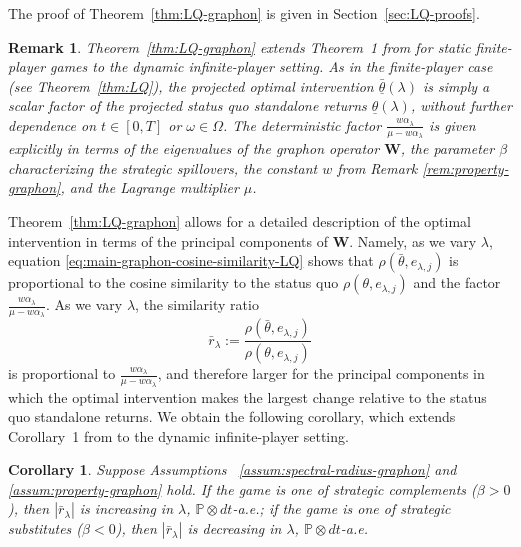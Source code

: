 \documentclass[11pt]{article}
\def\al{\alpha}
\def\P{\mathbb{P}}
\newtheorem{corollary}[theorem]{Corollary}
\newtheorem{remark}[theorem]{Remark}
\numberwithin{equation}{section}
\begin{document}
The proof of Theorem~\ref{thm:LQ-graphon} is given in Section~\ref{sec:LQ-proofs}.
\begin{remark}
Theorem~\ref{thm:LQ-graphon} extends Theorem~1 from \citet{galeotti2020targeting} for static finite-player games to the dynamic infinite-player setting. As in the finite-player case (see Theorem~\ref{thm:LQ}), the projected optimal intervention $\bar{\underline{\theta}}(\lambda)$ is simply a scalar factor of the projected status quo standalone returns ${\underline{\theta}}(\lambda)$, without further dependence on $t\in [0,T]$ or $\omega\in\Omega$. The deterministic  factor $\frac{w\al_\lambda}{\mu-w\al_\lambda}$ is given explicitly in terms of the eigenvalues of the graphon operator $\boldsymbol{W}$, the parameter $\beta$ characterizing the strategic spillovers, the constant $w$ from Remark \ref{rem:property-graphon}, and the Lagrange multiplier $\mu$.
\end{remark}
Theorem~\ref{thm:LQ-graphon} allows for a detailed description of the optimal intervention in terms of the principal components of $\boldsymbol{W}$. Namely, as we vary $\lambda$, equation \eqref{eq:main-graphon-cosine-similarity-LQ} shows that $\rho(\bar\theta,e_{\lambda,j})$ is proportional to the cosine similarity to the status quo $\rho(\theta,e_{\lambda,j})$ and the factor $\frac{w\al_\lambda}{\mu-w\al_\lambda}$. As we vary $\lambda$, the similarity ratio
$$
\bar{r}_\lambda:=\frac{\rho(\bar\theta,e_{\lambda,j})}{\rho(\theta,e_{\lambda,j})}
$$
is proportional to $\frac{w\al_\lambda}{\mu-w\al_\lambda}$, and therefore larger for the principal components in which the optimal intervention makes the largest change relative to the status quo standalone returns. We obtain the following corollary, which extends Corollary~1 from \cite{galeotti2020targeting} to the dynamic infinite-player setting.
\begin{corollary}\label{corollary:similarity-ratio-graphon}
    Suppose Assumptions~ \ref{assum:spectral-radius-graphon} and \ref{assum:property-graphon} hold. If the game is one of strategic complements ($\beta>0$), then $|\bar{r}_\lambda|$ is increasing in $\lambda$, $\P\otimes dt$-a.e.; if the game is one of strategic substitutes ($\beta<0$), then $|\bar{r}_\lambda|$ is decreasing in $\lambda$, $\P\otimes dt$-a.e.
\end{corollary}
\end{document}
